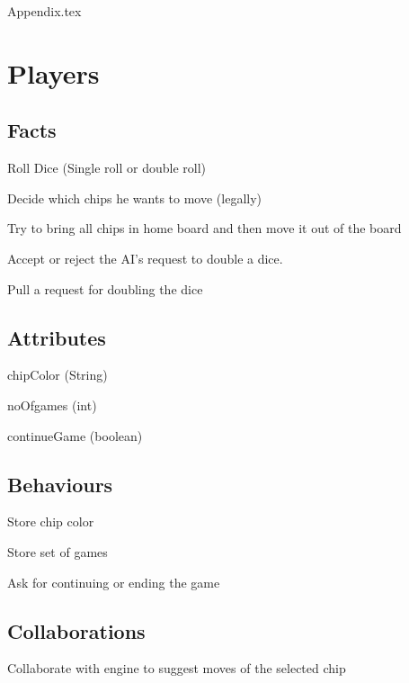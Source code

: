 \documentclass{report}
\begin{document}
















 {Appendix.tex}

\section{Players}

\subsection{Facts}

\begin{dashed}
    \item Roll Dice (Single roll or double roll)
    \item Decide which chips he wants to move (legally)
    \item Try to bring all chips in home board and then move it out of the board
    \item Accept or reject the AI's request to double a dice.
    \item Pull a request for doubling the dice
\end{dashed}

\subsection{Attributes}

    \begin{dashed}
        \item chipColor (String)
        \item noOfgames (int)
        \item continueGame (boolean)
    \end{dashed}

\subsection{Behaviours}

    \begin{dashed}
        \item Store chip color
        \item Store set of games
        \item Ask for continuing or ending the game
    \end{dashed}

\subsection{Collaborations}

    \begin{dashed}
        \item Collaborate with engine to suggest moves of the selected chip
    \end{dashed}
\end{document}
